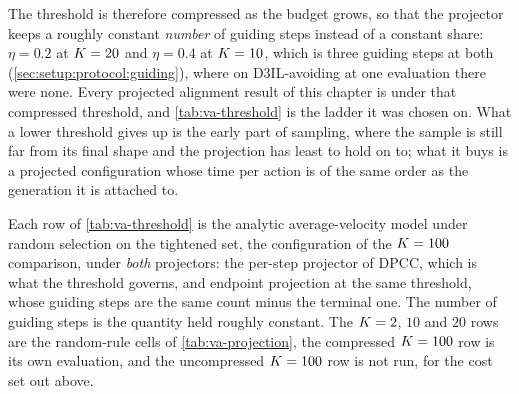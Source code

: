 The threshold is therefore compressed as the budget grows, so that the projector keeps a roughly constant
\emph{number} of guiding steps instead of a constant share: $\eta=0.2$ at $K=20$ and $\eta=0.4$ at
$K=10$, which is three guiding steps at both (\autoref{sec:setup:protocol:guiding}), where on
D3IL-avoiding at one evaluation there were none. Every projected alignment result of this chapter is under
that compressed threshold, and \autoref{tab:va-threshold} is the ladder it was chosen on. What a lower threshold gives up is the early part of sampling, where the sample is still
far from its final shape and the projection has least to hold on to; what it buys is a projected
configuration whose time per action is of the same order as the generation it is attached to.

Each row of \autoref{tab:va-threshold} is the analytic average-velocity model under random selection on
the tightened set, the configuration of the $K=100$ comparison, under \emph{both} projectors: the
per-step projector of \ac{DPCC}, which is what the threshold governs, and endpoint projection at the same
threshold, whose guiding steps are the same count minus the terminal one. The number of guiding steps is
the quantity held roughly constant. The $K=2$, $10$ and $20$ rows are the random-rule cells of
\autoref{tab:va-projection}, the compressed $K=100$ row is its own evaluation, and the uncompressed
$K=100$ row is not run, for the cost set out above.

